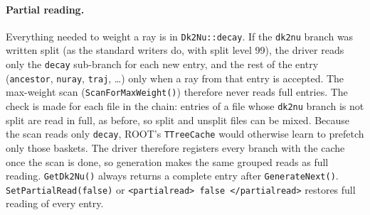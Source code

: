 \documentclass[11pt]{article}
\newcommand{\code}[1]{\texttt{#1}}
\begin{document}
\paragraph{Partial reading.}  Everything needed to weight a ray is in
\code{Dk2Nu::decay}.  If the \code{dk2nu} branch was written split (as the
standard writers do, with split level 99), the driver reads only the
\code{decay} sub-branch for each new entry, and the rest of the entry
(\code{ancestor}, \code{nuray}, \code{traj}, \ldots) only when a ray from
that entry is accepted.  The max-weight scan (\code{ScanForMaxWeight()})
therefore never reads full entries.  The check is made for each file in the
chain: entries of a file whose \code{dk2nu} branch is not split are read in
full, as before, so split and unsplit files can be mixed.  Because the
scan reads only \code{decay}, ROOT's \code{TTreeCache} would otherwise learn
to prefetch only those baskets.  The driver therefore registers every
branch with the cache once the scan is done, so generation makes the same
grouped reads as full reading.
\code{GetDk2Nu()} always returns a complete entry after
\code{GenerateNext()}.  \code{SetPartialRead(false)} or
\code{<partialread> false </partialread>} restores full reading of every
entry.
\end{document}
